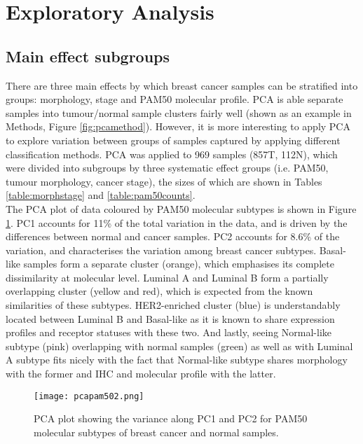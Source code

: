     
\section{Exploratory Analysis}


    \subsection{Main effect subgroups}

    There are three main effects by which breast cancer samples can be stratified into groups: morphology, stage and PAM50 molecular profile. PCA is able separate samples into tumour/normal sample clusters fairly well (shown as an example in Methods, Figure \ref{fig:pcamethod}). However, it is more interesting to apply PCA to explore variation between groups of samples captured by applying different classification methods.  
    PCA was applied to 969 samples (857T, 112N), which were divided into subgroups by three systematic effect groups (i.e. PAM50, tumour morphology, cancer stage), the sizes of which are shown in Tables \ref{table:morphstage} and \ref{table:pam50counts}. \\
    The PCA plot of data coloured by PAM50 molecular subtypes is shown in Figure \ref{fig:pcapam50}. PC1 accounts for 11\% of the total variation in the data, and is driven by the differences between normal and cancer samples. PC2 accounts for 8.6\% of the variation, and characterises the variation among breast cancer subtypes. Basal-like samples form a separate cluster (orange), which emphasises its complete dissimilarity at molecular level. Luminal A and Luminal B form a partially overlapping cluster (yellow and red), which is expected from the known similarities of these subtypes. HER2-enriched cluster (blue) is understandably located between Luminal B and Basal-like as it is known to share expression profiles and receptor statuses with these two. And lastly, seeing Normal-like subtype (pink) overlapping with normal samples (green) as well as with Luminal A subtype fits nicely with the fact that Normal-like subtype shares morphology with the former and IHC and molecular profile with the latter.    
    
            \begin{figure}[!h]
            \centering
            \texttt{[image: pcapam502.png]} 
            \caption{PCA plot showing the variance along PC1 and PC2 for PAM50 molecular subtypes of breast cancer and normal samples.}
            \label{fig:pcapam50}
            \end{figure}
            
